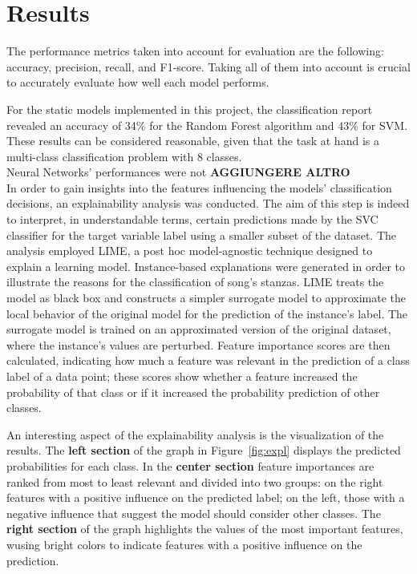 \chapter*{Results}
\label{ch:results}
The performance metrics taken into account for evaluation are the following:
accuracy, precision, recall, and F1-score. Taking all of them into account
is crucial to accurately evaluate how well each model performs.

For the static models implemented in this project, the classification report
revealed an accuracy of 34\% for the Random Forest algorithm and 43\% for SVM. 
These results can be considered reasonable, given that the task at hand is a
multi-class classification problem with 8 classes.\\

Neural Networks' performances were not \textbf{AGGIUNGERE ALTRO}\\

In order to gain insights into the features influencing the models' classification decisions, an explainability analysis was conducted.
The aim of this step is indeed to interpret, in understandable terms, certain predictions made by the SVC classifier for the target variable label using a smaller subset of the dataset. 
The analysis employed LIME, a post hoc model-agnostic technique designed to explain a learning model. Instance-based explanations were generated in order to illustrate the reasons for the classification of song's stanzas.
LIME treats the model as black box and constructs a simpler surrogate model to approximate the local behavior of the original model for the prediction of the instance's label. 
The surrogate model is trained on an approximated version of the original dataset, where the instance's values are perturbed. Feature importance scores are then calculated, 
indicating how much a feature was relevant in the prediction of a class label of a data point; these scores show whether a feature increased the probability of that class or if it increased the probability prediction of other classes.

An interesting aspect of the explainability analysis is the visualization of the results.
The \textbf{left section} of the graph in Figure~\ref{fig:expl} displays the predicted probabilities for each class. In the \textbf{center section}
feature importances are ranked from most to least relevant and divided into two groups: on the right
features with a positive influence on the predicted label; on the left, those with a negative influence that suggest the model should consider other classes.
The \textbf{right section} of the graph highlights the values of the most important
features, wusing bright colors to indicate features with a positive influence on the prediction.

